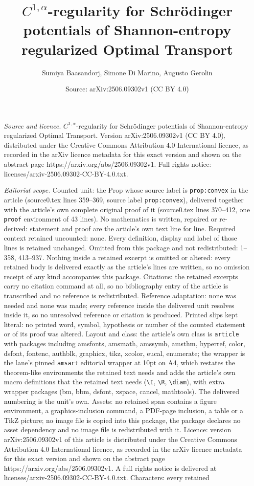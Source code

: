\documentclass[10pt,a4paper]{amsart}
\title[$C^{1,\alpha}$-regularity for Schr\"odinger potentials of Sh]{$C^{1,\alpha}$-regularity for Schr\"odinger potentials of Shannon-entropy regularized Optimal Transport}
\author{Sumiya Baasandorj, Simone Di Marino, Augusto Gerolin}
\date{Source: arXiv:2506.09302v1 (CC BY 4.0)}
\begin{document}
\maketitle

\noindent\emph{Source and licence.} $C^{1,\alpha}$-regularity for Schr\"odinger potentials of Shannon-entropy regularized Optimal Transport. Version arXiv:2506.09302v1 (CC BY 4.0), distributed under the Creative Commons Attribution 4.0 International licence, as recorded in the arXiv licence metadata for this exact version and shown on the abstract page https://arxiv.org/abs/2506.09302v1. Full rights notice: licenses/arxiv-2506.09302-CC-BY-4.0.txt.\par\smallskip

\noindent\textit{Editorial scope.} Counted unit: the Prop whose source label is \texttt{prop:convex} in the article (source0.tex lines 359--369, source label \texttt{prop:convex}), delivered together with the article's own complete original proof of it (source0.tex lines 370--412, one \texttt{proof} environment of 43 lines). No mathematics is written, repaired or re-derived: statement and proof are the article's own text line for line. Required context retained uncounted: none. Every definition, display and label of those lines is retained unchanged. Omitted from this package and not redistributed: 1--358, 413--937. Nothing inside a retained excerpt is omitted or altered: every retained body is delivered exactly as the article's lines are written, so no omission receipt of any kind accompanies this package. Citations: the retained excerpts carry no citation command at all, so no bibliography entry of the article is transcribed and no reference is redistributed. Reference adaptation: none was needed and none was made; every reference inside the delivered unit resolves inside it, so no unresolved reference or citation is produced. Printed slips kept literal: no printed word, symbol, hypothesis or number of the counted statement or of its proof was altered. Layout and class: the article's own class is \texttt{article} with packages including amsfonts, amsmath, amssymb, amsthm, hyperref, color, dsfont, fontenc, authblk, graphicx, tikz, xcolor, eucal, enumerate; the wrapper is the lane's pinned \texttt{amsart} editorial wrapper at 10pt on A4, which restates the theorem-like environments the retained text needs and adds the article's own macro definitions that the retained text needs (\texttt{\textbackslash I}, \texttt{\textbackslash R}, \texttt{\textbackslash diam}), with extra wrapper packages (bm, bbm, dsfont, xspace, cancel, mathtools). The delivered numbering is the unit's own. Assets: no retained span contains a figure environment, a graphics-inclusion command, a PDF-page inclusion, a table or a TikZ picture; no image file is copied into this package, the package declares no asset dependency and no image file is redistributed with it. Licence: version arXiv:2506.09302v1 of this article is distributed under the Creative Commons Attribution 4.0 International licence, as recorded in the arXiv licence metadata for this exact version and shown on the abstract page https://arxiv.org/abs/2506.09302v1. A full rights notice is delivered at licenses/arxiv-2506.09302-CC-BY-4.0.txt. Characters: every retained 
\end{document}
